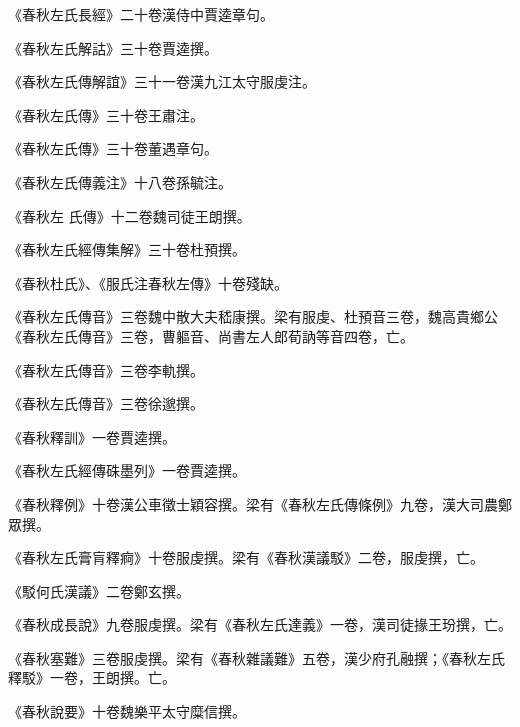 \begin{pinyinscope}
 《春秋左氏長經》二十卷漢侍中賈逵章句。



 《春秋左氏解詁》三十卷賈逵撰。



 《春秋左氏傳解誼》三十一卷漢九江太守服虔注。



 《春秋左氏傳》三十卷王肅注。



 《春秋左氏傳》三十卷董遇章句。



 《春秋左氏傳義注》十八卷孫毓注。



 《春秋左
 氏傳》十二卷魏司徒王朗撰。



 《春秋左氏經傳集解》三十卷杜預撰。



 《春秋杜氏》、《服氏注春秋左傳》十卷殘缺。



 《春秋左氏傳音》三卷魏中散大夫嵇康撰。梁有服虔、杜預音三卷，魏高貴鄉公《春秋左氏傳音》三卷，曹軀音、尚書左人郎荀訥等音四卷，亡。



 《春秋左氏傳音》三卷李軌撰。



 《春秋左氏傳音》三卷徐邈撰。



 《春秋釋訓》一卷賈逵撰。



 《春秋左氏經傳硃墨列》一卷賈逵撰。



 《春秋釋例》十卷漢公車徵士穎容撰。梁有《春秋左氏傳條例》九卷，漢大司農鄭眾撰。



 《春秋左氏膏肓釋痾》十卷服虔撰。梁有《春秋漢議駁》二卷，服虔撰，亡。



 《駁何氏漢議》二卷鄭玄撰。



 《春秋成長說》九卷服虔撰。梁有《春秋左氏達義》一卷，漢司徒掾王玢撰，亡。



 《春秋塞難》三卷服虔撰。梁有《春秋雜議難》五卷，漢少府孔融撰；《春秋左氏釋駁》一卷，王朗撰。亡。



 《春秋說要》十卷魏樂平太守糜信撰。




\end{pinyinscope}
